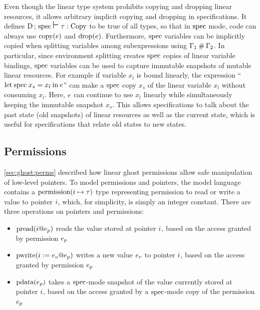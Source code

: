 Even though the linear type system prohibits copying and dropping linear resources,
it allows arbitrary implicit copying and dropping in specifications.
It defines $\textrm{D}\,;\, \textrm{spec}\: \mbox{\Large $\vdash$}\; \tau : \textrm{Copy}$ to be true of all types,
so that in $\textrm{spec}$ mode, code can always use $\textrm{copy}(e)$ and $\textrm{drop}(e)$.
Furthermore, $\textrm{spec}$ variables can be implicitly copied when splitting
variables among subexpressions using $\Gamma_1\:\#\:\Gamma_2$.
In particular, since environment splitting creates $\textrm{spec}$ copies of linear variable bindings,
$\textrm{spec}$ variables can be used to capture immutable snapshots of mutable linear resources.
For example if variable $x_l$ is bound linearly,
the expression ``$\textrm{let}\: \textrm{spec}\: x_s = {x_l}\:\textrm{in}\:{e}$''
can make a $\textrm{spec}$ copy $x_s$ of the linear variable $x_l$ without consuming $x_l$.
Here, $e$ can continue to use $x_l$ linearly while simultaneously
keeping the immutable snapshot $x_s$.
This allows specifications to talk about the past state (old snapshots) of linear resources
as well as the current state,
which is useful for specifications that relate old states to new states.

\subsection{Permissions} \label{sec:permissions}

\autoref{sec:ghost:perms} described how linear ghost permissions
allow safe manipulation of low-level pointers.
To model permissions and pointers,
the model language contains a $\textrm{permission}(i \mapsto \tau)$ type representing permission
to read or write a value to pointer $i$,
which, for simplicity, is simply an integer constant.
There are three operations on pointers and permissions:

\begin{itemize}
\item $\textrm{pread}(i @ e_p)$ reads the value stored at pointer $i$,
  based on the access granted by permission $e_p$
\item $\textrm{pwrite}(i := e_v @ e_p)$ writes a new value $e_v$ to pointer $i$,
  based on the access granted by permission $e_p$
\item $\textrm{pdata}(e_p)$ takes a $\textrm{spec}$-mode snapshot of the value currently stored at pointer $i$,
  based on the access granted by a $\textrm{spec}$-mode copy of the permission $e_p$
\end{itemize}

